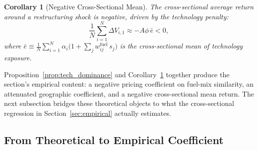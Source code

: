 \documentclass[12pt,a4paper]{article}
\newtheorem{corollary}{Corollary}
\begin{document}
\begin{corollary}[Negative Cross-Sectional Mean]\label{cor:asymmetry}
    The cross-sectional average return around a restructuring shock is negative, driven by the technology penalty:
    \begin{equation}
        \frac{1}{N}\sum_{i=1}^N \Delta V_{i,1} \approx -A\phi\,\bar{e} < 0,
    \end{equation}
    where $\bar{e} \equiv \frac{1}{N}\sum_{i=1}^N \alpha_i\bigl(1 + \sum_j w^{\mathrm{fuel}}_{ij}\, s_j\bigr)$ is the cross-sectional mean of technology exposure.
\end{corollary}

Proposition~\ref{prop:tech_dominance} and Corollary~\ref{cor:asymmetry} together produce the section's empirical content: a negative pricing coefficient on fuel-mix similarity, an attenuated geographic coefficient, and a negative cross-sectional mean return. The next subsection bridges these theoretical objects to what the cross-sectional regression in Section~\ref{sec:empirical} actually estimates.

\subsection{From Theoretical to Empirical Coefficient}\label{sec:bridge}
\end{document}
